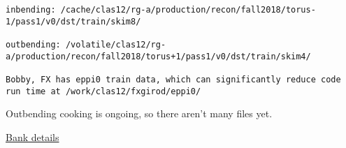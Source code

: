 
\begin{lstlisting}
inbending: /cache/clas12/rg-a/production/recon/fall2018/torus-1/pass1/v0/dst/train/skim8/

outbending: /volatile/clas12/rg-a/production/recon/fall2018/torus+1/pass1/v0/dst/train/skim4/

Bobby, FX has eppi0 train data, which can significantly reduce code run time at /work/clas12/fxgirod/eppi0/

\end{lstlisting}

Outbending cooking is ongoing, so there aren’t many files yet.


\href{https://clasweb.jlab.org/wiki/index.php/CLAS12_DSTs}{Bank details}
